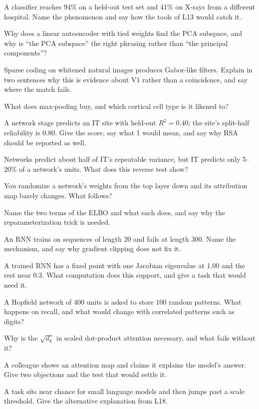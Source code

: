 \documentclass[11pt]{article}
\begin{document}
 A classifier reaches 94\% on a held-out test set and 41\% on X-rays from
a different hospital. Name the phenomenon and say how the tools of L13 would
catch it.

 Why does a linear autoencoder with tied weights find the PCA subspace,
and why is ``the PCA subspace'' the right phrasing rather than ``the principal
components''?

 Sparse coding on whitened natural images produces Gabor-like filters.
Explain in two sentences why this is evidence about V1 rather than a coincidence,
and say where the match fails.

 What does max-pooling buy, and which cortical cell type is it likened
to?

 A network stage predicts an IT site with held-out $R^2=0.40$; the site's
split-half reliability is 0.80. Give the score, say what 1 would mean, and say
why RSA should be reported as well.

 Networks predict about half of IT's repeatable variance, but IT
predicts only 5--20\% of a network's units. What does this reverse test show?

 You randomize a network's weights from the top layer down and its
attribution map barely changes. What follows?

 Name the two terms of the ELBO and what each does, and say why the
reparameterization trick is needed.

 An RNN trains on sequences of length 20 and fails at length 300.
Name the mechanism, and say why gradient clipping does not fix it.

 A trained RNN has a fixed point with one Jacobian eigenvalue at 1.00
and the rest near 0.3. What computation does this support, and give a task that
would need it.

 A Hopfield network of 400 units is asked to store 100 random patterns.
What happens on recall, and what would change with correlated patterns such as
digits?

 Why is the $\sqrt{d_k}$ in scaled dot-product attention necessary, and
what fails without it?

 A colleague shows an attention map and claims it explains the model's
answer. Give two objections and the test that would settle it.

 A task sits near chance for small language models and then jumps past
a scale threshold. Give the alternative explanation from L18.
\end{document}
